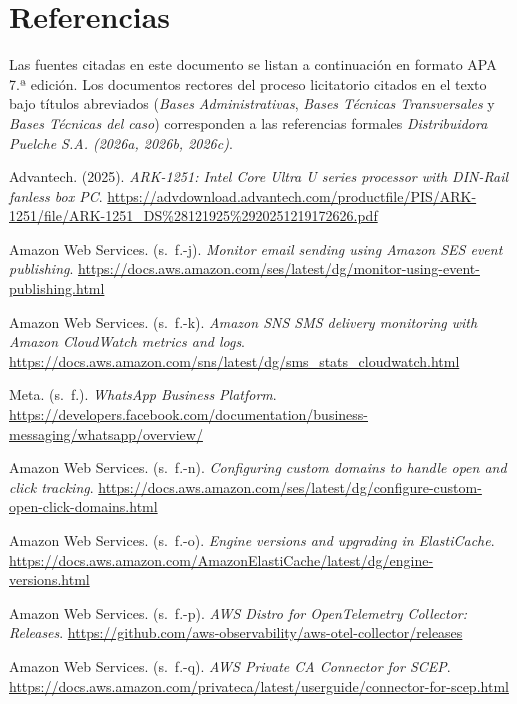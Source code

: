 \section*{Referencias}

Las fuentes citadas en este documento se listan a continuación en formato APA 7.ª edición. Los documentos rectores del proceso licitatorio citados en el texto bajo títulos abreviados (\textit{Bases Administrativas}, \textit{Bases Técnicas Transversales} y \textit{Bases Técnicas del caso}) corresponden a las referencias formales \textit{Distribuidora Puelche S.A. (2026a, 2026b, 2026c)}.

\begin{list}{}{\setlength{\leftmargin}{1.27cm}\setlength{\itemindent}{-1.27cm}\setlength{\itemsep}{0.5\baselineskip}\raggedright}
\item Advantech. (2025). \textit{ARK-1251: Intel Core Ultra U series processor with DIN-Rail fanless box PC}. \url{https://advdownload.advantech.com/productfile/PIS/ARK-1251/file/ARK-1251_DS%28121925%2920251219172626.pdf}
\item Amazon Web Services. (s.~f.-j). \textit{Monitor email sending using Amazon SES event publishing}. \url{https://docs.aws.amazon.com/ses/latest/dg/monitor-using-event-publishing.html}
\item Amazon Web Services. (s.~f.-k). \textit{Amazon SNS SMS delivery monitoring with Amazon CloudWatch metrics and logs}. \url{https://docs.aws.amazon.com/sns/latest/dg/sms_stats_cloudwatch.html}
\item Meta. (s.~f.). \textit{WhatsApp Business Platform}. \url{https://developers.facebook.com/documentation/business-messaging/whatsapp/overview/}
\item Amazon Web Services. (s.~f.-n). \textit{Configuring custom domains to handle open and click tracking}. \url{https://docs.aws.amazon.com/ses/latest/dg/configure-custom-open-click-domains.html}
\item Amazon Web Services. (s.~f.-o). \textit{Engine versions and upgrading in ElastiCache}. \url{https://docs.aws.amazon.com/AmazonElastiCache/latest/dg/engine-versions.html}
\item Amazon Web Services. (s.~f.-p). \textit{AWS Distro for OpenTelemetry Collector: Releases}. \url{https://github.com/aws-observability/aws-otel-collector/releases}
\item Amazon Web Services. (s.~f.-q). \textit{AWS Private CA Connector for SCEP}. \url{https://docs.aws.amazon.com/privateca/latest/userguide/connector-for-scep.html}

\end{list}
